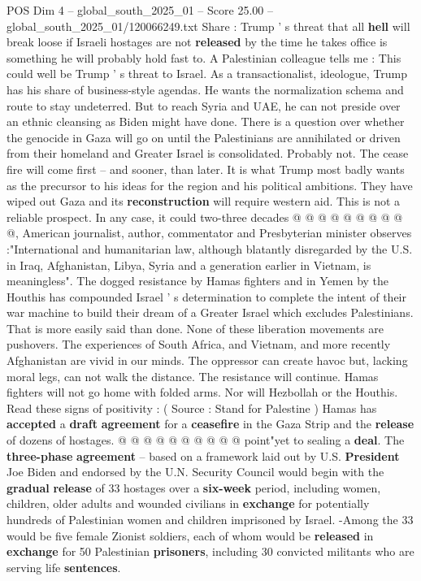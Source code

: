 \begin{textsample}{POS Dim 4 – global\_south\_2025\_01 – Score 25.00 – global\_south\_2025\_01/120066249.txt}  \label{ex:f4_pos_020}
Share : Trump ' s threat that all \textbf{hell} will break loose if Israeli hostages are not \textbf{released} by the time he takes office is something he will probably hold fast to.
A Palestinian colleague tells me : This could well be Trump ' s threat to Israel.
As a transactionalist, ideologue, Trump has his share of business-style agendas.
He wants the normalization schema and route to stay undeterred.
But to reach Syria and UAE, he can not preside over an ethnic cleansing as Biden might have done.
There is a question over whether the genocide in Gaza will go on until the Palestinians are annihilated or driven from their homeland and Greater Israel is consolidated.
Probably not.
The cease fire will come first -- and sooner, than later.
It is what Trump most badly wants as the precursor to his ideas for the region and his political ambitions.
They have wiped out Gaza and its \textbf{reconstruction} will require western aid.
This is not a reliable prospect.
In any case, it could two-three decades @ @ @ @ @ @ @ @ @ @, American journalist, author, commentator and Presbyterian minister observes :"International and humanitarian law, although blatantly disregarded by the U.S. in Iraq, Afghanistan, Libya, Syria and a generation earlier in Vietnam, is meaningless".
The dogged resistance by Hamas fighters and in Yemen by the Houthis has compounded Israel ' s determination to complete the intent of their war machine to build their dream of a Greater Israel which excludes Palestinians.
That is more easily said than done.
None of these liberation movements are pushovers.
The experiences of South Africa, and Vietnam, and more recently Afghanistan are vivid in our minds.
The oppressor can create havoc but, lacking moral legs, can not walk the distance.
The resistance will continue.
Hamas fighters will not go home with folded arms.
Nor will Hezbollah or the Houthis.
Read these signs of positivity : ( Source : Stand for Palestine ) Hamas has \textbf{accepted} a \textbf{draft} \textbf{agreement} for a \textbf{ceasefire} in the Gaza Strip and the \textbf{release} of dozens of hostages. @ @ @ @ @ @ @ @ @ @ point"yet to sealing a \textbf{deal}.
The \textbf{three-phase} \textbf{agreement} -- based on a framework laid out by U.S. \textbf{President} Joe Biden and endorsed by the U.N.
Security Council would begin with the \textbf{gradual} \textbf{release} of 33 hostages over a \textbf{six-week} period, including women, children, older adults and wounded civilians in \textbf{exchange} for potentially hundreds of Palestinian women and children imprisoned by Israel. -Among the 33 would be five female Zionist soldiers, each of whom would be \textbf{released} in \textbf{exchange} for 50 Palestinian \textbf{prisoners}, including 30 convicted militants who are serving life \textbf{sentences}.

\end{textsample}
